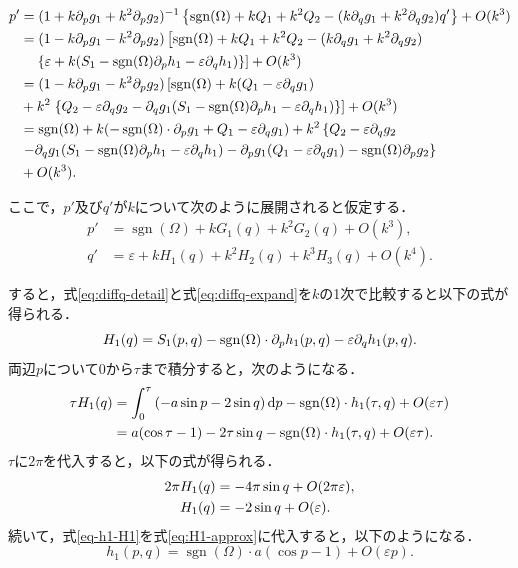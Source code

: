 \documentclass[../main]{subfiles}
\begin{document}
    \begin{align}
        p'&=(1+k\partial_p g_1+k^2\partial_p g_2)^{-1}\left\{ \operatorname{sgn}(\Omega)+kQ_1+k^2Q_2-(k\partial_q g_1+k^2\partial_q g_2)q' \right\}+O(k^3)\notag\\
        &=(1-k\partial_p g_1-k^2\partial_p g_2)\left[ \operatorname{sgn}(\Omega)+kQ_1+k^2Q_2-(k\partial_q g_1+k^2\partial_q g_2)\right.\notag\\
        &\quad \left.\left\{\varepsilon+k(S_1-\operatorname{sgn}(\Omega) \partial_ph_1-\varepsilon\partial_qh_1)\right\} \right]+O(k^3)\notag\\
        &=(1-k\partial_p g_1-k^2\partial_p g_2)\left[ \operatorname{sgn}(\Omega)+k(Q_1-\varepsilon\partial_qg_1)\right.\notag\\
        &+k^2\left.\left\{Q_2-\varepsilon\partial_qg_2-\partial_qg_1(S_1-\operatorname{sgn}(\Omega) \partial_ph_1-\varepsilon\partial_qh_1)\right\}\right]+O(k^3)\notag\\
        &=\operatorname{sgn}(\Omega)+k(-\operatorname{sgn}(\Omega)\cdot\partial_p g_1+Q_1-\varepsilon \partial_q g_1)+k^2\left\{Q_2-\varepsilon\partial_qg_2\right.\notag\\
        &\left.-\partial_qg_1(S_1-\operatorname{sgn}(\Omega) \partial_ph_1-\varepsilon\partial_qh_1)-\partial_pg_1(Q_1-\varepsilon\partial_qg_1)-\operatorname{sgn}(\Omega) \partial_pg_2\right\}\notag\\
        &+O(k^3).
        \label{eq:diff-p-order1}
    \end{align}

    ここで，$p'$及び$q'$が$k$について次のように展開されると仮定する．
    \begin{align}
        p'&=\operatorname{sgn}(\Omega)+kG_1(q)+k^2G_2(q)+O(k^3)\label{eq:diffp-expand},\\    
        q'&=\varepsilon+kH_1(q)+k^2H_2(q)+k^3H_3(q)+O(k^4)\label{eq:diffq-expand}.    
    \end{align}

    すると，式\eqref{eq:diffq-detail}と式\eqref{eq:diffq-expand}を$k$の1次で比較すると以下の式が得られる．  
    \begin{equation}
        H_1(q)=S_1(p,q)-\operatorname{sgn}(\Omega)\cdot \partial_p h_1(p,q)-\varepsilon \partial_q h_1(p,q).
    \end{equation}
    両辺$p$について$0$から$\tau$まで積分すると，次のようになる．
    \begin{align}
        \tau H_1(q)&=\int_0^{\tau}\left(-a\sin p-2\sin q\right)\dd{p}-\operatorname{sgn}(\Omega)\cdot h_1(\tau,q)+O(\varepsilon\tau)\notag \\
        &=a(\cos \tau-1)-2\tau\sin q-\operatorname{sgn}(\Omega)\cdot h_1(\tau,q)+O(\varepsilon\tau).
        \label{eq-h1-H1}
    \end{align}
    $\tau$に$2\pi$を代入すると，以下の式が得られる．
    \begin{align}
        2\pi H_1(q)&=-4\pi\sin q+O(2\pi\varepsilon),\notag\\
        H_1(q)&=-2\sin q+O(\varepsilon).
        \label{eq:H1-approx}
    \end{align}
    続いて，式\eqref{eq-h1-H1}を式\eqref{eq:H1-approx}に代入すると，以下のようになる．
    \begin{equation}
        h_1(p,q)=\operatorname{sgn}(\Omega)\cdot a(\cos p-1)+O(\varepsilon p).
        \label{eq:h1-approx}
    \end{equation}
\end{document}
